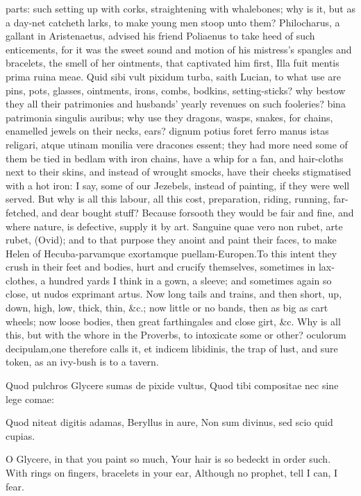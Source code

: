 {parts: such setting up with corks, straightening with whalebones; why
is it, but as a day-net catcheth larks, to make young men stoop unto
them? Philocharus, a gallant in Aristenaetus, advised his friend
Poliaenus to take heed of such enticements, for it was the sweet
sound and motion of his mistress's spangles and bracelets, the smell of
her ointments, that captivated him first, Illa fuit mentis prima ruina
meae. Quid sibi vult pixidum turba, saith Lucian, to what use are
pins, pots, glasses, ointments, irons, combs, bodkins, setting-sticks?
why bestow they all their patrimonies and husbands' yearly revenues on
such fooleries? bina patrimonia singulis auribus; why use they
dragons, wasps, snakes, for chains, enamelled jewels on their necks,
ears? dignum potius foret ferro manus istas religari, atque utinam
monilia vere dracones essent; they had more need some of them be tied
in bedlam with iron chains, have a whip for a fan, and hair-cloths next
to their skins, and instead of wrought smocks, have their cheeks
stigmatised with a hot iron: I say, some of our Jezebels, instead of
painting, if they were well served. But why is all this labour, all
this cost, preparation, riding, running, far-fetched, and dear bought
stuff? Because forsooth they would be fair and fine, and where
nature, is defective, supply it by art. Sanguine quae vero non
rubet, arte rubet, (Ovid); and to that purpose they anoint and paint
their faces, to make Helen of Hecuba-parvamque exortamque
puellam-Europen.To this intent they crush in their feet and
bodies, hurt and crucify themselves, sometimes in lax-clothes, a
hundred yards I think in a gown, a sleeve; and sometimes again so
close, ut nudos exprimant artus. Now long tails and trains, and
then short, up, down, high, low, thick, thin, \&c.; now little or no
bands, then as big as cart wheels; now loose bodies, then great
farthingales and close girt, \&c. Why is all this, but with the whore in
the Proverbs, to intoxicate some or other? oculorum decipulam,one
therefore calls it, et indicem libidinis, the trap of lust, and sure
token, as an ivy-bush is to a tavern.

Quod pulchros Glycere sumas de pixide vultus,
Quod tibi compositae nec sine lege comae:

Quod niteat digitis adamas, Beryllus in aure,
Non sum divinus, sed scio quid cupias.


O Glycere, in that you paint so much,
Your hair is so bedeckt in order such.
With rings on fingers, bracelets in your ear,
Although no prophet, tell I can, I fear.

}
